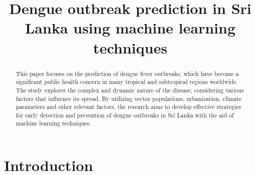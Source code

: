 \documentclass[conference]{IEEEtran}
\begin{document}
\title{Dengue outbreak prediction in Sri Lanka using machine learning techniques\\}

\author{
    \and
    \and
    \and
}

\maketitle

\begin{abstract}
    This paper focuses on the prediction of dengue fever outbreaks, which have become a significant
    public health concern in many tropical and subtropical regions worldwide. The study explores
    the complex and dynamic nature of the disease, considering various factors that influence its spread.
    By utilizing vector populations, urbanization, climate parameters and other relevant factors, 
    the research aims to develop effective strategies for early detection and prevention of dengue 
    outbreaks in Sri Lanka with the aid of machine learning techniques.

\end{abstract}


\section{Introduction}
\end{document}
